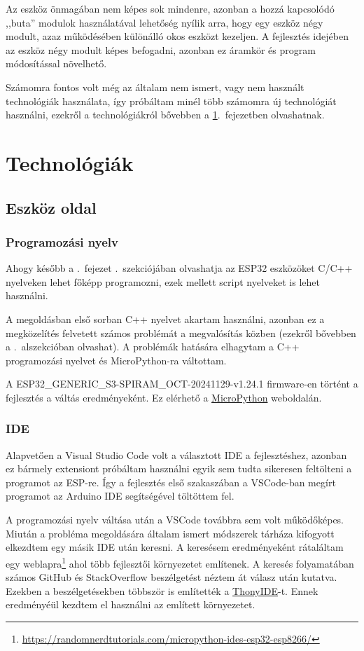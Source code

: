 \documentclass{thesis-ekf}
\theoremstyle{definition}
\theoremstyle{remark}
\begin{document}
	Az eszköz önmagában nem képes sok mindenre, azonban a hozzá kapcsolódó ,,buta'' modulok használatával lehetőség nyílik arra, hogy egy eszköz négy modult, azaz működésében különálló okos eszközt kezeljen.
	A fejlesztés idejében az eszköz négy modult képes befogadni, azonban ez áramkör és program módosítással növelhető.
	
	Számomra fontos volt még az általam nem ismert, vagy nem használt technológiák használata, így próbáltam minél több számomra új technológiát használni, ezekről a technológiákról bővebben a \ref{ch_tech}.~fejezetben olvashatnak.
	\chapter{Technológiák}
	\label{ch_tech}
	\section{Eszköz oldal}
	\subsection{Programozási nyelv}
	Ahogy később a .~fejezet .~szekciójában olvashatja az ESP32 eszközöket C/C++ nyelveken lehet főképp programozni, ezek mellett script nyelveket is lehet használni.
	
	A megoldásban első sorban C++ nyelvet akartam használni, azonban ez a megközelítés felvetett számos problémát a megvalósítás közben (ezekről bővebben a .~alszekcióban olvashat). A problémák hatására elhagytam a C++ programozási nyelvet és MicroPython-ra váltottam.
	
	A ESP32\_GENERIC\_S3-SPIRAM\_OCT-20241129-v1.24.1 firmware-en történt a fejlesztés a váltás eredményeként. Ez elérhető a \href{https://micropython.org/download/}{MicroPython} weboldalán.
	\subsection{IDE}
	Alapvetően a Visual Studio Code volt a választott IDE a fejlesztéshez, azonban ez bármely extensiont próbáltam használni egyik sem tudta sikeresen feltölteni a programot az ESP-re. Így a fejlesztés első szakaszában a VSCode-ban megírt programot az Arduino IDE segítségével töltöttem fel.
	
	A programozási nyelv váltása után a VSCode továbbra sem volt működőképes. Miután a probléma megoldására általam ismert módszerek tárháza kifogyott elkezdtem egy másik IDE után keresni. A keresésem eredményeként rátaláltam egy weblapra\footnote{\url{https://randomnerdtutorials.com/micropython-ides-esp32-esp8266/}} ahol több fejlesztői környezetet említenek. A keresés folyamatában számos GitHub és StackOverflow beszélgetést néztem át válasz után kutatva. Ezekben a beszélgetésekben többször is említették a \href{https://thonny.org/}{ThonyIDE}-t. Ennek eredményéül kezdtem el használni az említett környezetet.
\end{document}
